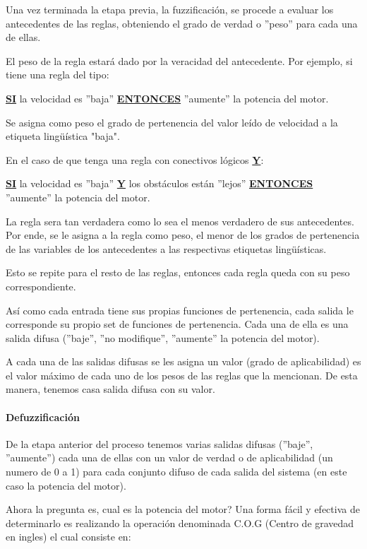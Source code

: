 Una vez terminada la etapa previa, la fuzzificación, se procede a evaluar los antecedentes de las reglas, obteniendo el grado de verdad o ''peso'' para cada una de ellas.\par

El peso de la regla estará dado por la veracidad del antecedente. Por ejemplo, si tiene una regla del tipo: \par

\begin{center}
\uline{\bfseries SI} la velocidad es ''baja'' \uline{\bfseries ENTONCES} ''aumente'' la potencia del motor.
\end{center}

Se asigna como peso el grado de pertenencia del valor leído de velocidad a la etiqueta lingüística "baja".

En el caso de que tenga una regla con conectivos lógicos \uline{\bfseries Y}:

\begin{center}
\uline{\bfseries SI} la velocidad es ''baja'' \uline{\bfseries Y} los obstáculos están ''lejos'' \uline{\bfseries ENTONCES} ''aumente'' la potencia del motor.
\end{center}

La regla sera tan verdadera como lo sea el menos verdadero de sus antecedentes. Por ende, se le asigna a la regla como peso, el menor de los grados de pertenencia de las variables de los antecedentes a las respectivas etiquetas lingüísticas.\par
Esto se repite para el resto de las reglas, entonces cada regla queda con su peso correspondiente.\par
\bigbreak
Así como cada entrada tiene sus propias funciones de pertenencia, cada salida le corresponde su propio set de funciones de pertenencia. Cada una de ella es una salida difusa (''baje'', ''no modifique'', ''aumente'' la potencia del motor).\par
\bigbreak
A cada una de las salidas difusas se les asigna un valor (grado de aplicabilidad) es el valor máximo de cada uno de los pesos de las reglas que la mencionan. De esta manera, tenemos casa salida difusa con su valor.

\paragraph{Defuzzificación}

De la etapa anterior del proceso tenemos varias salidas difusas (''baje'', ''aumente'') cada una de ellas con un valor de verdad o de aplicabilidad (un numero de 0 a 1) para cada conjunto difuso de cada salida del sistema (en este caso la potencia del motor).\par
\bigbreak
Ahora la pregunta es, cual es la potencia del motor? Una forma fácil y efectiva de determinarlo es realizando la operación denominada C.O.G (Centro de gravedad en ingles) el cual consiste en: \par

